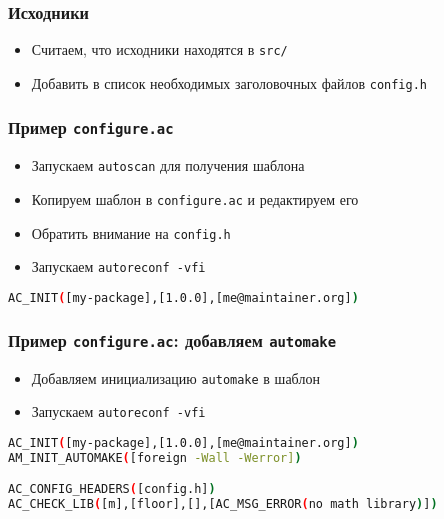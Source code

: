 \begin{frame}[fragile]
\frametitle{Исходники}

	\begin{itemize}
		\item Считаем, что исходники находятся в {\tt src/}
		\item Добавить в список необходимых заголовочных файлов {\tt config.h}
	\end{itemize}
\end{frame}


\begin{frame}[fragile]
\frametitle{Пример \texttt{configure.ac}}

	\begin{itemize}
		\item Запускаем {\tt autoscan} для получения шаблона
		\item Копируем шаблон в \texttt{configure.ac} и редактируем его
		\item[] Обратить внимание на {\tt config.h}
		\item Запускаем {\tt autoreconf -vfi}
	\end{itemize}

\begin{lstlisting}[language=sh]
AC_INIT([my-package],[1.0.0],[me@maintainer.org])
\end{lstlisting}
\end{frame}

\begin{frame}[fragile]
	\frametitle{Пример \texttt{configure.ac}: добавляем {\tt automake}}

	\begin{itemize}
		\item Добавляем инициализацию {\tt automake} в шаблон
		\item Запускаем {\tt autoreconf -vfi}
	\end{itemize}

\begin{lstlisting}[language=sh]
AC_INIT([my-package],[1.0.0],[me@maintainer.org])
AM_INIT_AUTOMAKE([foreign -Wall -Werror])

AC_CONFIG_HEADERS([config.h])
AC_CHECK_LIB([m],[floor],[],[AC_MSG_ERROR(no math library)])

\end{lstlisting}
\end{frame}

